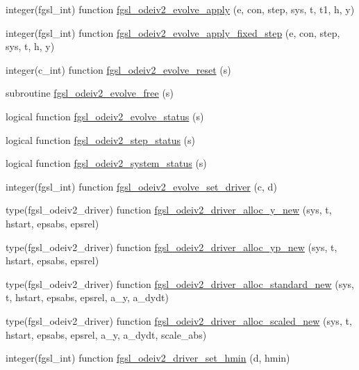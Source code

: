 \begin{DoxyCompactItemize}
integer(fgsl\-\_\-int) function \hyperlink{ode_8finc_a94f2449150c4cc934484446ddf00636e}{fgsl\-\_\-odeiv2\-\_\-evolve\-\_\-apply} (e, con, step, sys, t, t1, h, y)
\item 
integer(fgsl\-\_\-int) function \hyperlink{ode_8finc_a221c3e2d1c2c1ae0f92062e0e25d46a9}{fgsl\-\_\-odeiv2\-\_\-evolve\-\_\-apply\-\_\-fixed\-\_\-step} (e, con, step, sys, t, h, y)
\item 
integer(c\-\_\-int) function \hyperlink{ode_8finc_a58db655eeefa6587785e3681fe1f1fe3}{fgsl\-\_\-odeiv2\-\_\-evolve\-\_\-reset} (s)
\item 
subroutine \hyperlink{ode_8finc_ae420fff7079d79241900c38192a15b18}{fgsl\-\_\-odeiv2\-\_\-evolve\-\_\-free} (s)
\item 
logical function \hyperlink{ode_8finc_a903a7d2d07429f4d1ce0291ed0a29cf6}{fgsl\-\_\-odeiv2\-\_\-evolve\-\_\-status} (s)
\item 
logical function \hyperlink{ode_8finc_aae3c317f1477f7e8896ed8fa1a50a5ef}{fgsl\-\_\-odeiv2\-\_\-step\-\_\-status} (s)
\item 
logical function \hyperlink{ode_8finc_acedda44a6ed7e98748b97edc43597fbf}{fgsl\-\_\-odeiv2\-\_\-system\-\_\-status} (s)
\item 
integer(fgsl\-\_\-int) function \hyperlink{ode_8finc_a3a068def5f64087448b8b725b56f0f44}{fgsl\-\_\-odeiv2\-\_\-evolve\-\_\-set\-\_\-driver} (c, d)
\item 
type(fgsl\-\_\-odeiv2\-\_\-driver) function \hyperlink{ode_8finc_abb00c1c5c177a7c9a456b02f34a4a9b4}{fgsl\-\_\-odeiv2\-\_\-driver\-\_\-alloc\-\_\-y\-\_\-new} (sys, t, hstart, epsabs, epsrel)
\item 
type(fgsl\-\_\-odeiv2\-\_\-driver) function \hyperlink{ode_8finc_a178c0c3dd596ef26f99e99825d4586d7}{fgsl\-\_\-odeiv2\-\_\-driver\-\_\-alloc\-\_\-yp\-\_\-new} (sys, t, hstart, epsabs, epsrel)
\item 
type(fgsl\-\_\-odeiv2\-\_\-driver) function \hyperlink{ode_8finc_a06a42be695134e3e8301b7148e7ce838}{fgsl\-\_\-odeiv2\-\_\-driver\-\_\-alloc\-\_\-standard\-\_\-new} (sys, t, hstart, epsabs, epsrel, a\-\_\-y, a\-\_\-dydt)
\item 
type(fgsl\-\_\-odeiv2\-\_\-driver) function \hyperlink{ode_8finc_a37b762b00ed8cc4614a5290998dd0be7}{fgsl\-\_\-odeiv2\-\_\-driver\-\_\-alloc\-\_\-scaled\-\_\-new} (sys, t, hstart, epsabs, epsrel, a\-\_\-y, a\-\_\-dydt, scale\-\_\-abs)
\item 
integer(fgsl\-\_\-int) function \hyperlink{ode_8finc_a1a52468942b08b4fc33a09404492b67e}{fgsl\-\_\-odeiv2\-\_\-driver\-\_\-set\-\_\-hmin} (d, hmin)

\end{DoxyCompactItemize}
